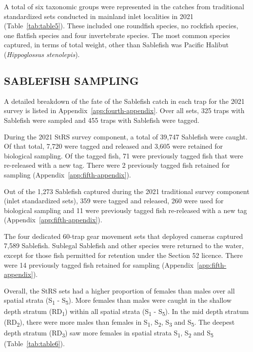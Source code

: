 \documentclass[12pt]{article}\usepackage[]{graphicx}\usepackage[]{color}
\begin{document}
A total of six taxonomic groups were represented in the catches from traditional standardized sets conducted in mainland inlet localities in 2021 (Table~\ref{tab:table5}). These included one roundfish species, no rockfish species, one flatfish species and four invertebrate species. The most common species captured, in terms of total weight, other than Sablefish was Pacific Halibut (\emph{Hippoglossus stenolepis}).

\hypertarget{sablefish-sampling}{%
\subsection{SABLEFISH SAMPLING}\label{sablefish-sampling}}

A detailed breakdown of the fate of the Sablefish catch in each trap for the 2021 survey is listed in Appendix~\ref{app:fourth-appendix}. Over all sets, 325 traps with Sablefish were sampled and 455 traps with Sablefish were tagged.

During the 2021 StRS survey component, a total of 39,747 Sablefish were caught. Of that total, 7,720 were tagged and released and 3,605 were retained for biological sampling. Of the tagged fish, 71 were previously tagged fish that were re-released with a new tag. There were 2 previously tagged fish retained for sampling (Appendix~\ref{app:fifth-appendix}).

Out of the 1,273 Sablefish captured during the 2021 traditional survey component (inlet standardized sets), 359 were tagged and released, 260 were used for biological sampling and 11 were previously tagged fish re-released with a new tag (Appendix~\ref{app:fifth-appendix}).

The four dedicated 60-trap gear movement sets that deployed cameras captured 7,589 Sablefish. Sublegal Sablefish and other species were returned to the water, except for those fish permitted for retention under the Section 52 licence. There were 14 previously tagged fish retained for sampling (Appendix~\ref{app:fifth-appendix}).

Overall, the StRS sets had a higher proportion of females than males over all spatial strata (S\textsubscript{1} - S\textsubscript{5}). More females than males were caught in the shallow depth stratum (RD\textsubscript{1}) within all spatial strata (S\textsubscript{1} - S\textsubscript{5}). In the mid depth stratum (RD\textsubscript{2}), there were more males than females in S\textsubscript{1}, S\textsubscript{2}, S\textsubscript{3} and S\textsubscript{5}. The deepest depth stratum (RD\textsubscript{3}) saw more females in spatial strata S\textsubscript{1}, S\textsubscript{2} and S\textsubscript{5} (Table~\ref{tab:table6}).
\end{document}
